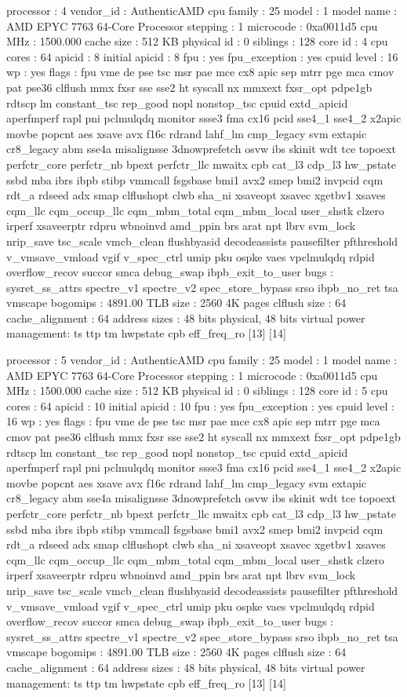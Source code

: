 processor	: 4
vendor_id	: AuthenticAMD
cpu family	: 25
model		: 1
model name	: AMD EPYC 7763 64-Core Processor
stepping	: 1
microcode	: 0xa0011d5
cpu MHz		: 1500.000
cache size	: 512 KB
physical id	: 0
siblings	: 128
core id		: 4
cpu cores	: 64
apicid		: 8
initial apicid	: 8
fpu		: yes
fpu_exception	: yes
cpuid level	: 16
wp		: yes
flags		: fpu vme de pse tsc msr pae mce cx8 apic sep mtrr pge mca cmov pat pse36 clflush mmx fxsr sse sse2 ht syscall nx mmxext fxsr_opt pdpe1gb rdtscp lm constant_tsc rep_good nopl nonstop_tsc cpuid extd_apicid aperfmperf rapl pni pclmulqdq monitor ssse3 fma cx16 pcid sse4_1 sse4_2 x2apic movbe popcnt aes xsave avx f16c rdrand lahf_lm cmp_legacy svm extapic cr8_legacy abm sse4a misalignsse 3dnowprefetch osvw ibs skinit wdt tce topoext perfctr_core perfctr_nb bpext perfctr_llc mwaitx cpb cat_l3 cdp_l3 hw_pstate ssbd mba ibrs ibpb stibp vmmcall fsgsbase bmi1 avx2 smep bmi2 invpcid cqm rdt_a rdseed adx smap clflushopt clwb sha_ni xsaveopt xsavec xgetbv1 xsaves cqm_llc cqm_occup_llc cqm_mbm_total cqm_mbm_local user_shstk clzero irperf xsaveerptr rdpru wbnoinvd amd_ppin brs arat npt lbrv svm_lock nrip_save tsc_scale vmcb_clean flushbyasid decodeassists pausefilter pfthreshold v_vmsave_vmload vgif v_spec_ctrl umip pku ospke vaes vpclmulqdq rdpid overflow_recov succor smca debug_swap ibpb_exit_to_user
bugs		: sysret_ss_attrs spectre_v1 spectre_v2 spec_store_bypass srso ibpb_no_ret tsa vmscape
bogomips	: 4891.00
TLB size	: 2560 4K pages
clflush size	: 64
cache_alignment	: 64
address sizes	: 48 bits physical, 48 bits virtual
power management: ts ttp tm hwpstate cpb eff_freq_ro [13] [14]

processor	: 5
vendor_id	: AuthenticAMD
cpu family	: 25
model		: 1
model name	: AMD EPYC 7763 64-Core Processor
stepping	: 1
microcode	: 0xa0011d5
cpu MHz		: 1500.000
cache size	: 512 KB
physical id	: 0
siblings	: 128
core id		: 5
cpu cores	: 64
apicid		: 10
initial apicid	: 10
fpu		: yes
fpu_exception	: yes
cpuid level	: 16
wp		: yes
flags		: fpu vme de pse tsc msr pae mce cx8 apic sep mtrr pge mca cmov pat pse36 clflush mmx fxsr sse sse2 ht syscall nx mmxext fxsr_opt pdpe1gb rdtscp lm constant_tsc rep_good nopl nonstop_tsc cpuid extd_apicid aperfmperf rapl pni pclmulqdq monitor ssse3 fma cx16 pcid sse4_1 sse4_2 x2apic movbe popcnt aes xsave avx f16c rdrand lahf_lm cmp_legacy svm extapic cr8_legacy abm sse4a misalignsse 3dnowprefetch osvw ibs skinit wdt tce topoext perfctr_core perfctr_nb bpext perfctr_llc mwaitx cpb cat_l3 cdp_l3 hw_pstate ssbd mba ibrs ibpb stibp vmmcall fsgsbase bmi1 avx2 smep bmi2 invpcid cqm rdt_a rdseed adx smap clflushopt clwb sha_ni xsaveopt xsavec xgetbv1 xsaves cqm_llc cqm_occup_llc cqm_mbm_total cqm_mbm_local user_shstk clzero irperf xsaveerptr rdpru wbnoinvd amd_ppin brs arat npt lbrv svm_lock nrip_save tsc_scale vmcb_clean flushbyasid decodeassists pausefilter pfthreshold v_vmsave_vmload vgif v_spec_ctrl umip pku ospke vaes vpclmulqdq rdpid overflow_recov succor smca debug_swap ibpb_exit_to_user
bugs		: sysret_ss_attrs spectre_v1 spectre_v2 spec_store_bypass srso ibpb_no_ret tsa vmscape
bogomips	: 4891.00
TLB size	: 2560 4K pages
clflush size	: 64
cache_alignment	: 64
address sizes	: 48 bits physical, 48 bits virtual
power management: ts ttp tm hwpstate cpb eff_freq_ro [13] [14]

